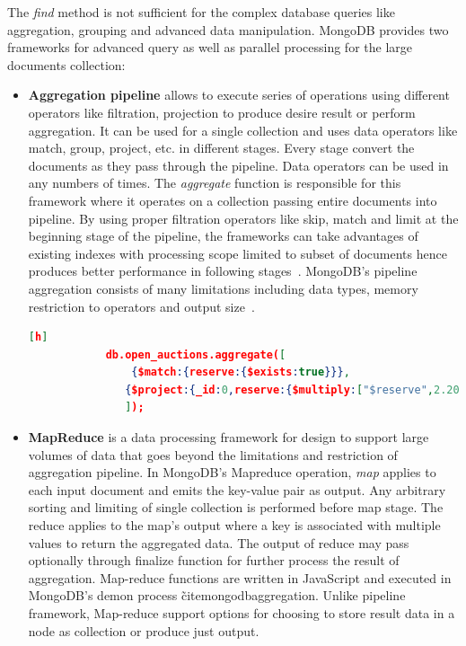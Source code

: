  The \textit{find} method is not sufficient for the complex database queries like aggregation, grouping  and advanced data manipulation. MongoDB provides two frameworks for  advanced query as well as parallel processing for the large documents collection:
 \begin{itemize}
		\item{ \textbf{Aggregation pipeline}} allows to execute series of operations using different operators like filtration, projection to produce desire result or perform aggregation.  It can be used for a single collection and uses  data operators like match, group, project, etc. in different stages. Every stage convert the documents as they pass through the pipeline. Data operators can be used  in any numbers of times.  The \textit{aggregate} function is responsible for this framework where it operates on a collection passing  entire documents into pipeline. By using proper filtration operators like  skip, match and limit at the beginning  stage of the pipeline,  the frameworks can take advantages of existing indexes with processing scope limited to subset of documents  hence produces better performance in following stages~\cite{mongodbaggregation}. MongoDB's pipeline aggregation consists of many limitations including data types, memory restriction to operators and output size~\cite{nosql/comparision}. 
		
				   \begin{lstlisting}[language=JSON,caption=An example Aggregation pipeline in MongoDB, label=mongodb-aggregation-pipeline, basicstyle = \scriptsize][h]
            db.open_auctions.aggregate([
                {$match:{reserve:{$exists:true}}},
		       {$project:{_id:0,reserve:{$multiply:["$reserve",2.20371]}}}
		       ]);
		  \end{lstlisting}
		  
		  \item{\textbf{MapReduce}} is a data processing framework for design to support large volumes of data that goes beyond the limitations and restriction of aggregation pipeline.  In MongoDB's Mapreduce operation,  \textit{map} applies to each input document and emits the key-value pair as output. Any arbitrary sorting and limiting  of single collection is performed before map stage. The reduce applies to the map's output where a key is associated with multiple values to return the aggregated data. The output of reduce may pass optionally through finalize function for further process the result of aggregation. Map-reduce functions are written in JavaScript and executed in MongoDB's demon process \~cite{mongodbaggregation}.  Unlike pipeline framework, Map-reduce support options for choosing to store result  data in a node as collection or  produce just output. 
		  
\end{itemize}		

